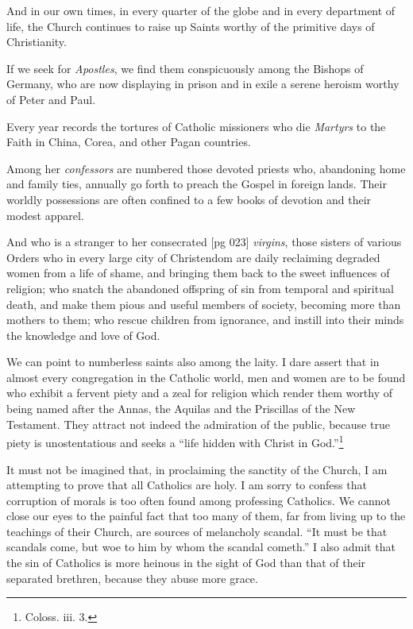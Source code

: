 And in our own times, in every quarter of the
globe and in every department of life, the Church
continues to raise up Saints worthy of the primitive
days of Christianity.

If we seek for \emph{Apostles}, we find them conspicuously
among the Bishops of Germany, who are
now displaying in prison and in exile a serene
heroism worthy of Peter and Paul.

Every year records the tortures of Catholic
missioners who die \emph{Martyrs} to the Faith in China,
Corea, and other Pagan countries.

Among her \emph{confessors} are numbered those devoted
priests who, abandoning home and family
ties, annually go forth to preach the Gospel in
foreign lands. Their worldly possessions are
often confined to a few books of devotion and their
modest apparel.

And who is a stranger to her consecrated
[pg 023]
\emph{virgins}, those sisters of various Orders who in
every large city of Christendom are daily reclaiming
degraded women from a life of shame, and
bringing them back to the sweet influences of religion;
who snatch the abandoned offspring of sin
from temporal and spiritual death, and make them
pious and useful members of society, becoming
more than mothers to them; who rescue children
from ignorance, and instill into their minds the
knowledge and love of God.

We can point to numberless saints also among
the laity. I dare assert that in almost every congregation
in the Catholic world, men and women
are to be found who exhibit a fervent piety and a
zeal for religion which render them worthy of being
named after the Annas, the Aquilas and the
Priscillas of the New Testament. They attract
not indeed the admiration of the public, because
true piety is unostentatious and seeks a “life hidden
with Christ in God.”\footnote{Coloss. iii. 3.}

It must not be imagined that, in proclaiming the
sanctity of the Church, I am attempting to prove
that all Catholics are holy. I am sorry to confess
that corruption of morals is too often found among
professing Catholics. We cannot close our eyes to
the painful fact that too many of them, far from
living up to the teachings of their Church, are
sources of melancholy scandal. “It must be that
scandals come, but woe to him by whom the scandal
cometh.” I also admit that the sin of Catholics
is more heinous in the sight of God than that of
their separated brethren, because they abuse more
grace.

